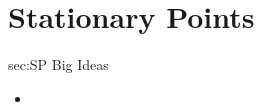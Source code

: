 \chapter{Stationary Points}
\label{chap:SP}

\begin{bigideas}{sec:SP Big Ideas}
\begin{itemize}
  \item 
\end{itemize}
\end{bigideas}